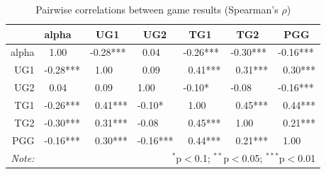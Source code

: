 \documentclass[12pt]{article}
\begin{document}
{\begin{table}[!htbp] \centering 
  \caption{Pairwise correlations between game results (Spearman\rq s \(\rho\))} 
  \label{} \centering
  \begin{tabular}{rllllll}
  \hline
 & alpha &  \ UG1 & \ UG2 & \ TG1 & \ TG2 & \ PGG \\ 
  \hline
alpha &   \ 1.00  & -0.28*** & \ 0.04  & -0.26*** & -0.30*** & -0.16*** \\ 
  UG1 & -0.28*** & \ 1.00  &  \ 0.09  & \ 0.41*** & \ 0.31*** &  \ 0.30*** \\ 
  UG2 &  \ 0.04  &  \ 0.09  &  1.00  & -0.10* & -0.08  & -0.16*** \\ 
  TG1 & -0.26*** & \  0.41*** & -0.10* & \ 1.00  & \ 0.45*** &  \ 0.44*** \\ 
  TG2 & -0.30*** &  \ 0.31*** & -0.08  &  \ 0.45*** & \ 1.00  &  \ 0.21*** \\ 
  PGG & -0.16*** &  \ 0.30*** & -0.16*** & \  0.44*** & \ 0.21*** &  \ 1.00  \\ 
   \hline
      \textit{Note:}  & \multicolumn{6}{r}{$^{*}$p$<$0.1; $^{**}$p$<$0.05; $^{***}$p$<$0.01} \\ 
\end{tabular}
\end{table}

}
\end{document}
